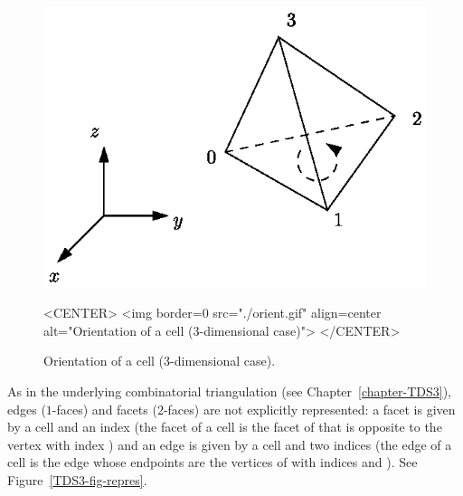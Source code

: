 \begin{figure}[htbp]
\begin{ccTexOnly}
\begin{center} 
\includegraphics{orient.eps} 
\end{center}
\end{ccTexOnly}
\caption{Orientation of a cell (3-dimensional case).
\label{Triangulation3-fig-orient}}
\begin{ccHtmlOnly}
<CENTER>
<img border=0 src="./orient.gif" align=center alt="Orientation of a cell 
(3-dimensional case)">
</CENTER>
\end{ccHtmlOnly}
\end{figure} 

As in the underlying combinatorial triangulation (see
Chapter~\ref{chapter-TDS3}), edges ($1$-faces) and facets ($2$-faces)
are not explicitly 
represented: a facet is given by a cell and an index (the facet
 of a cell  is the facet of  that is opposite to
the vertex with index ) and an edge is given by a cell and two
indices (the edge  of a cell  is the edge whose
endpoints are the vertices of  with indices  and
). See Figure~\ref{TDS3-fig-repres}.  

